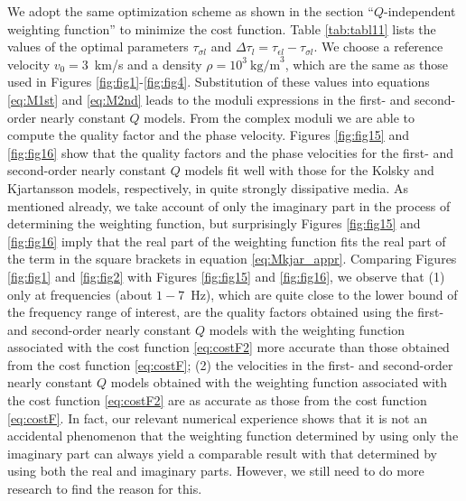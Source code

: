 \documentclass[article]{./macros/elsarticle_qh}
\begin{document}
We adopt the same optimization scheme as shown in the section ``$Q$-independent weighting function'' to minimize the cost function. 
Table \ref{tab:tabl11} lists the values of the optimal parameters $\tau_{\sigma l}$ and $\Delta \tau_{l} = \tau_{\epsilon l} - \tau_{\sigma l}$. We choose a reference velocity $v_{0}=3$~km/s and a density $\rho=10^3~\text{kg/m}^3$, which are the same as those used in Figures \ref{fig:fig1}-\ref{fig:fig4}. Substitution of these values into equations \ref{eq:M1st} and \ref{eq:M2nd} leads to the moduli expressions in the first- and second-order nearly constant $Q$ models. From the complex moduli we are able to compute the quality factor and the phase velocity. Figures \ref{fig:fig15} and \ref{fig:fig16} show that the quality factors and the phase velocities for the first- and second-order nearly constant $Q$ models fit well with those for the Kolsky and Kjartansson models, respectively, in quite strongly dissipative media. As mentioned already, we take account of only the imaginary part in the process of determining the weighting function, but surprisingly Figures \ref{fig:fig15} and \ref{fig:fig16} imply that the real part of the weighting function fits the real part of the term in the square brackets in equation \ref{eq:Mkjar_appr}. Comparing Figures \ref{fig:fig1} and \ref{fig:fig2} with Figures \ref{fig:fig15} and \ref{fig:fig16}, we observe that (1) only at frequencies (about $1-7$~Hz), which are quite close to the lower bound of the frequency range of interest, are the quality factors obtained using the first- and second-order nearly constant $Q$ models with the weighting function associated with the cost function \ref{eq:costF2} more accurate than those obtained from the cost function \ref{eq:costF}; (2) the velocities in the first- and second-order nearly constant $Q$ models obtained with the weighting function associated with the cost function \ref{eq:costF2} are as accurate as those from the cost function \ref{eq:costF}. In fact, our relevant numerical experience shows that it is not an accidental phenomenon that the weighting function determined by using only the imaginary part can always yield a comparable result with that determined by using both the real and imaginary parts. However, we still need to do more research to find the reason for this.  
\end{document}
